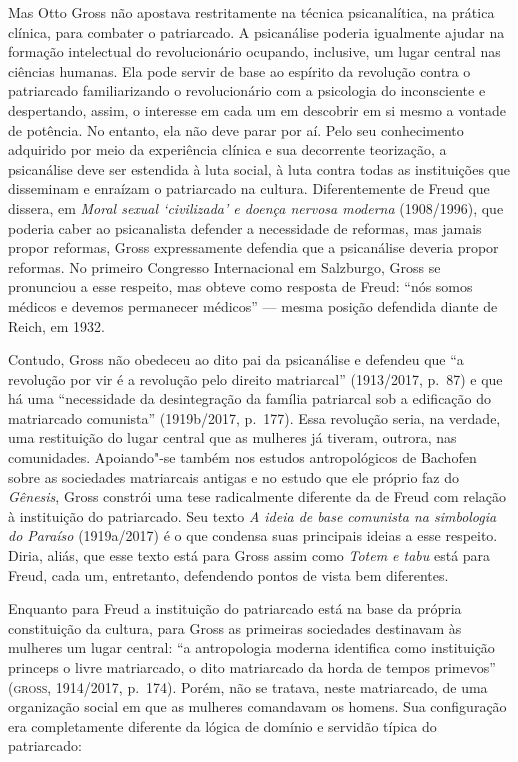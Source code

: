 Mas Otto Gross não apostava restritamente na técnica psicanalítica, na
prática clínica, para combater o patriarcado. A psicanálise poderia
igualmente ajudar na formação intelectual do revolucionário ocupando,
inclusive, um lugar central nas ciências humanas. Ela pode servir de
base ao espírito da revolução contra o patriarcado familiarizando o
revolucionário com a psicologia do inconsciente e despertando, assim, o
interesse em cada um em descobrir em si mesmo a vontade de potência. No
entanto, ela não deve parar por aí. Pelo seu conhecimento adquirido por
meio da experiência clínica e sua decorrente teorização, a psicanálise
deve ser estendida à luta social, à luta contra todas as instituições
que disseminam e enraízam o patriarcado na cultura. Diferentemente de
Freud que dissera, em \emph{Moral sexual `civilizada' e doença nervosa
moderna} (1908/1996), que poderia caber ao psicanalista defender a necessidade de
reformas, mas jamais propor reformas, Gross expressamente defendia que a
psicanálise deveria propor reformas. No primeiro Congresso Internacional
em Salzburgo, Gross se pronunciou a esse respeito, mas obteve como
resposta de Freud: ``nós somos médicos e devemos permanecer médicos'' ---
mesma posição defendida diante de Reich, em 1932.

Contudo, Gross não obedeceu ao dito pai da psicanálise e defendeu que
``a revolução por vir é a revolução pelo direito matriarcal'' (1913/2017, p.~87) e que há
uma ``necessidade da desintegração da família patriarcal sob a
edificação do matriarcado comunista'' (1919b/2017, p.~177). Essa revolução seria, na
verdade, uma restituição do lugar central que as mulheres já tiveram,
outrora, nas comunidades. Apoiando"-se também nos estudos antropológicos
de Bachofen sobre as sociedades matriarcais antigas e no estudo que ele
próprio faz do \emph{Gênesis}, Gross constrói uma tese radicalmente
diferente da de Freud com relação à instituição do patriarcado. Seu
texto \emph{A ideia de base comunista na simbologia do Paraíso} (1919a/2017) é o que
condensa suas principais ideias a esse respeito. Diria, aliás, que esse
texto está para Gross assim como \emph{Totem e tabu} está para Freud,
cada um, entretanto, defendendo pontos de vista bem diferentes.

Enquanto para Freud a instituição do patriarcado está na base da própria
constituição da cultura, para Gross as primeiras sociedades destinavam
às mulheres um lugar central: ``a antropologia moderna identifica como
instituição princeps o livre matriarcado, o dito matriarcado da horda de
tempos primevos'' (\textsc{gross}, 1914/2017, p.~174). Porém, não se tratava, neste matriarcado, de uma organização social em que as mulheres comandavam os homens. Sua
configuração era completamente diferente da lógica de domínio e servidão
típica do patriarcado:

